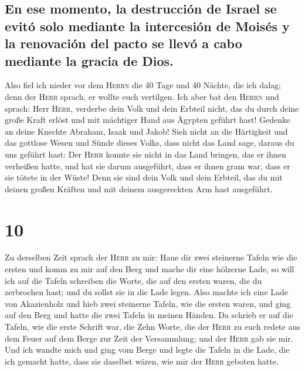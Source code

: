 \hypertarget{en-ese-momento-la-destrucciuxf3n-de-israel-se-evituxf3-solo-mediante-la-intercesiuxf3n-de-moisuxe9s-y-la-renovaciuxf3n-del-pacto-se-llevuxf3-a-cabo-mediante-la-gracia-de-dios.}{%
\subsection{En ese momento, la destrucción de Israel se evitó solo
mediante la intercesión de Moisés y la renovación del pacto se llevó a
cabo mediante la gracia de
Dios.}\label{en-ese-momento-la-destrucciuxf3n-de-israel-se-evituxf3-solo-mediante-la-intercesiuxf3n-de-moisuxe9s-y-la-renovaciuxf3n-del-pacto-se-llevuxf3-a-cabo-mediante-la-gracia-de-dios.}}

 Also fiel ich nieder vor dem \textsc{Herrn} die 40 Tage
und 40 Nächte, die ich dalag; denn der \textsc{Herr} sprach, er wollte
euch vertilgen.  Ich aber bat den \textsc{Herrn} und
sprach: Herr \textsc{Herr}, verderbe dein Volk und dein Erbteil nicht,
das du durch deine große Kraft erlöst und mit mächtiger Hand aus Ägypten
geführt hast!  Gedenke an deine Knechte Abraham, Isaak
und Jakob! Sieh nicht an die Härtigkeit und das gottlose Wesen und Sünde
dieses Volks,  dass nicht das Land sage, daraus du uns
geführt hast: Der \textsc{Herr} konnte sie nicht in das Land bringen,
das er ihnen verheißen hatte, und hat sie darum ausgeführt, dass er
ihnen gram war, dass er sie tötete in der Wüste!  Denn
sie sind dein Volk und dein Erbteil, das du mit deinen großen Kräften
und mit deinem ausgereckten Arm hast ausgeführt.

\hypertarget{section-9}{%
\section{10}\label{section-9}}

 Zu derselben Zeit sprach der \textsc{Herr} zu mir: Haue
dir zwei steinerne Tafeln wie die ersten und komm zu mir auf den Berg
und mache dir eine hölzerne Lade,  so will ich auf die
Tafeln schreiben die Worte, die auf den ersten waren, die du zerbrochen
hast; und du sollst sie in die Lade legen.  Also machte
ich eine Lade von Akazienholz und hieb zwei steinerne Tafeln, wie die
ersten waren, und ging auf den Berg und hatte die zwei Tafeln in meinen
Händen.  Da schrieb er auf die Tafeln, wie die erste
Schrift war, die Zehn Worte, die der \textsc{Herr} zu euch redete aus
dem Feuer auf dem Berge zur Zeit der Versammlung; und der \textsc{Herr}
gab sie mir.  Und ich wandte mich und ging vom Berge und
legte die Tafeln in die Lade, die ich gemacht hatte, dass sie daselbst
wären, wie mir der \textsc{Herr} geboten hatte.

